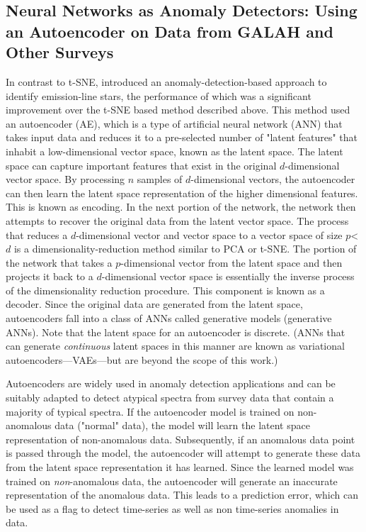 \subsection{Neural Networks as Anomaly Detectors: Using an Autoencoder on Data from GALAH and Other Surveys}

In contrast to t-SNE, \citet{vcotar2021galah} introduced an anomaly-detection-based approach to identify emission-line stars, the performance of which was a significant improvement over the t-SNE based method described above. This method used an autoencoder (AE), which is a type of artificial neural network (ANN) that takes input data and reduces it to a pre-selected number of "latent features" that inhabit a low-dimensional vector space, known as the latent space. The latent space can capture important features that exist in the original $d$-dimensional vector space. By processing $n$ samples of $d$-dimensional vectors, the autoencoder can then learn the latent space representation of the higher dimensional features. This is known as encoding. In the next portion of the network, the network then attempts to recover the original data from the latent vector space. The process that reduces a $d$-dimensional vector and vector space to a vector space of size $p$<$d$ is a dimensionality-reduction method similar to PCA or t-SNE. The portion of the network that takes a $p$-dimensional vector from the latent space and then projects it back to a $d$-dimensional vector space is essentially the inverse process of the dimensionality reduction procedure. This component is known as a decoder. Since the original data are generated from the latent space, autoencoders fall into a class of ANNs called generative models (generative ANNs). Note that the latent space for an autoencoder is discrete. (ANNs that can generate {\em continuous} latent spaces in this manner are known as variational autoencoders—VAEs—but are beyond the scope of this work.) 

Autoencoders are widely used in anomaly detection applications \citep{sakurada2014anomaly} and can be suitably adapted to detect atypical spectra from survey data that contain a majority of typical spectra. If the autoencoder model is trained on non-anomalous data ("normal" data), the model will learn the latent space representation of non-anomalous data. Subsequently, if an anomalous data point is passed through the model, the autoencoder will attempt to generate these data from the latent space representation it has learned. Since the learned model was trained on {\em non}-anomalous data, the autoencoder will generate an inaccurate representation of the anomalous data. This leads to a prediction error, which can be used as a flag to detect time-series as well as non time-series anomalies in data.

